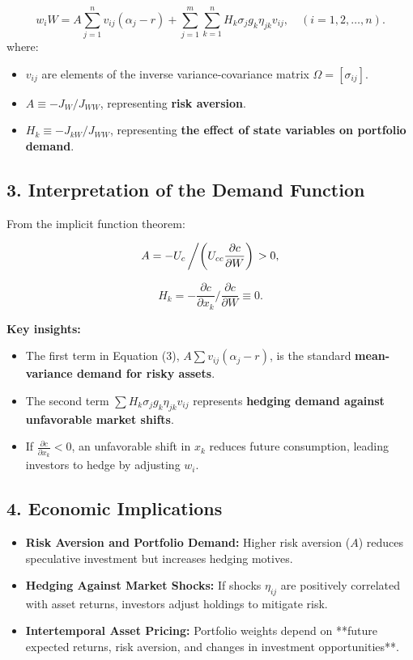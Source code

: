 \documentclass{article}
\begin{document}
\begin{equation}
w_i W = A \sum_{j=1}^{n} v_{ij} (\alpha_j - r) + \sum_{j=1}^{m} \sum_{k=1}^{n} H_k \sigma_j g_k \eta_{jk} v_{ij}, \quad (i = 1, 2, \dots, n).
\end{equation}
where:
\begin{itemize}
    \item \( v_{ij} \) are elements of the inverse variance-covariance matrix \( \Omega = [\sigma_{ij}] \).
    \item \( A \equiv -J_W / J_{WW} \), representing \textbf{risk aversion}.
    \item \( H_k \equiv -J_{kW} / J_{WW} \), representing \textbf{the effect of state variables on portfolio demand}.
\end{itemize}

\subsection*{3. Interpretation of the Demand Function}
From the implicit function theorem:

\begin{equation}
A = - U_c \left/ \left( U_{cc} \frac{\partial c}{\partial W} \right) \right. > 0,
\end{equation}

\begin{equation}
H_k = - \frac{\partial c}{\partial x_k} \Big/ \frac{\partial c}{\partial W} \equiv 0.
\end{equation}

\textbf{Key insights:}
\begin{itemize}
    \item The first term in Equation (3), \( A \sum v_{ij} (\alpha_j - r) \), is the standard \textbf{mean-variance demand for risky assets}.
    \item The second term \( \sum H_k \sigma_j g_k \eta_{jk} v_{ij} \) represents \textbf{hedging demand against unfavorable market shifts}.
    \item If \( \frac{\partial c}{\partial x_k} < 0 \), an unfavorable shift in \( x_k \) reduces future consumption, leading investors to hedge by adjusting \( w_i \).
\end{itemize}

\subsection*{4. Economic Implications}
\begin{itemize}
    \item \textbf{Risk Aversion and Portfolio Demand:} Higher risk aversion (\( A \)) reduces speculative investment but increases hedging motives.
    \item \textbf{Hedging Against Market Shocks:} If shocks \( \eta_{ij} \) are positively correlated with asset returns, investors adjust holdings to mitigate risk.
    \item \textbf{Intertemporal Asset Pricing:} Portfolio weights depend on **future expected returns, risk aversion, and changes in investment opportunities**.
\end{itemize}
\end{document}

